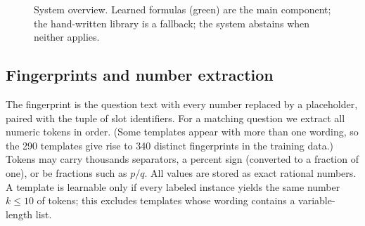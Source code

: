 \documentclass[conference]{IEEEtran}
\begin{document}
\begin{figure}[!t]
\centering
{}
\caption{System overview. Learned formulas (green) are the main component; the
hand-written library is a fallback; the system abstains when neither applies.}
\label{fig_pipeline}
\end{figure}

\subsection{Fingerprints and number extraction}
The fingerprint is the question text with every number replaced by a placeholder,
paired with the tuple of slot identifiers. For a matching question we extract
all numeric tokens in order. (Some templates appear with more than one wording, so the 290 templates give rise to 340 distinct fingerprints in the training data.) Tokens may carry thousands separators, a percent
sign (converted to a fraction of one), or be fractions such as $p/q$. All values
are stored as exact rational numbers. A template is learnable only if every
labeled instance yields the same number $k\le 10$ of tokens; this excludes
templates whose wording contains a variable-length list.
\end{document}
